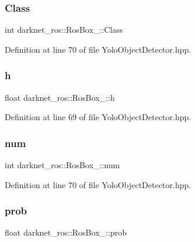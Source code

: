 \subsubsection{\texorpdfstring{Class}{Class}}
{\footnotesize\ttfamily int darknet\+\_\+ros\+::\+Ros\+Box\+\_\+\+::\+Class}



Definition at line 70 of file Yolo\+Object\+Detector.\+hpp.

\mbox{\label{structdarknet__ros_1_1RosBox___ab45fb51f3bad36fe0a0b4ff9da147db1}} 
\subsubsection{\texorpdfstring{h}{h}}
{\footnotesize\ttfamily float darknet\+\_\+ros\+::\+Ros\+Box\+\_\+\+::h}



Definition at line 69 of file Yolo\+Object\+Detector.\+hpp.

\mbox{\label{structdarknet__ros_1_1RosBox___a340216f7b02139bf7ea909a54be99431}} 
\subsubsection{\texorpdfstring{num}{num}}
{\footnotesize\ttfamily int darknet\+\_\+ros\+::\+Ros\+Box\+\_\+\+::num}



Definition at line 70 of file Yolo\+Object\+Detector.\+hpp.

\mbox{\label{structdarknet__ros_1_1RosBox___af6b75d5d9a851b3efb5aeb8ea86cf8ee}} 
\subsubsection{\texorpdfstring{prob}{prob}}
{\footnotesize\ttfamily float darknet\+\_\+ros\+::\+Ros\+Box\+\_\+\+::prob}



